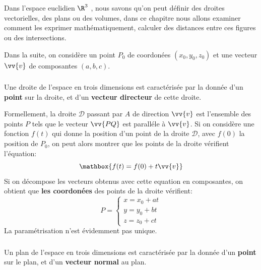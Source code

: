 \chapter*{} %

Dans l'espace euclidien \(\R^3\) , nous savons qu'on peut définir des droites vectorielles, des plans ou des volumes, dans ce chapitre nous allons examiner comment les exprimer mathématiquement, calculer des distances entre ces figures ou des intersections. \<

Dans la suite, on considère un point \(P_0\) de coordonées \((x_0, y_0, z_0)\) et une vecteur \(\vv{v}\) de composantes \((a, b, c)\).

\subsection*{}
Une droite de l'espace en trois dimensions est caractérisée par la donnée d'un \textbf{point} sur la droite, et d'un \textbf{vecteur directeur} de cette droite.\<

Formellement, la droite \(\mathscr{D}\) passant par \(A\) de direction \(\vv{v}\) est l'ensemble des points \(P\) tels que le vecteur 
\(\vv{PQ}\) est paralléle à \(\vv{v}\).\+
Si on considère une fonction \(f(t)\) qui donne la position d'un point de la droite \(\mathscr{D}\), avec \(f(0)\) la position de \(P_0\), on peut alors montrer que les points de la droite vérifient l'équation:
\[
   \mathbox{f(t) = f(0) + t\vv{v}}   
\]
Si on décompose les vecteurs obtenus avec cette equation en composantes, on obtient que \textbf{les coordonées} des points de la droite vérifient:
\[
   P = \begin{cases} 
      x = x_0 + at\\
      y = y_0 + bt\\
      z = z_0 + ct
   \end{cases} 
\]
La paramétrisation n'est évidemment pas unique.

\subsection*{}
Un plan de l'espace en trois dimensions est caractérisée par la donnée d'un \textbf{point} sur le plan, et d'un \textbf{vecteur normal} au plan.\<

